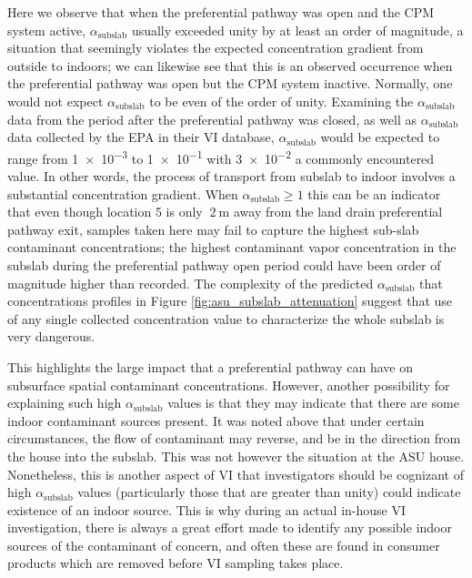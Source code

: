 Here we observe that when the preferential pathway was open and the CPM system active, $\alpha_\mathrm{subslab}$ usually exceeded unity by at least an order of magnitude, a situation that seemingly violates the expected concentration gradient from outside to indoors; we can likewise see that this is an observed occurrence when the preferential pathway was open but the CPM system inactive.
Normally, one would not expect $\alpha_\mathrm{subslab}$ to be even of the order of unity.
Examining the $\alpha_\mathrm{subslab}$ data from the period after the preferential pathway was closed, as well as $\alpha_\mathrm{subslab}$ data collected by the EPA in their VI database, $\alpha_\mathrm{subslab}$ would be expected to range from \num{1e-3} to \num{1e-1} with \num{3e-2} a commonly encountered value\cite{u.s._environmental_protection_agency_oswer_2015}.
In other words, the process of transport from subslab to indoor involves a substantial concentration gradient.
When $\alpha_\mathrm{subslab} \geq 1$ this can be an indicator that even though location 5 is only $~\SI{2}{\metre}$ away from the land drain preferential pathway exit, samples taken here may fail to capture the highest sub-slab contaminant concentrations; the highest contaminant vapor concentration in the subslab during the preferential pathway open period could  have been order of magnitude higher than recorded.
The complexity of the predicted $\alpha_\mathrm{subslab}$ that concentrations profiles in Figure \ref{fig:asu_subslab_attenuation} suggest that use of any single collected concentration value to characterize the whole subslab is very dangerous.\par

This highlights the large impact that a preferential pathway can have on subsurface spatial contaminant concentrations.
However, another possibility for explaining such high $\alpha_\mathrm{subslab}$ values is that they may indicate that there are some indoor contaminant sources present.
It was noted above that under certain circumstances, the flow of contaminant may reverse, and be in the direction from the house into the subslab.
This was not however the situation at the ASU house.
Nonetheless, this is another aspect of VI that investigators should be cognizant of high $\alpha_\mathrm{subslab}$ values (particularly those that are greater than unity) could indicate existence of an indoor source.
This is why during an actual in-house VI investigation, there is always a great effort made to identify any possible indoor sources of the contaminant of concern, and often these are found in consumer products which are removed before VI sampling takes place.\par

